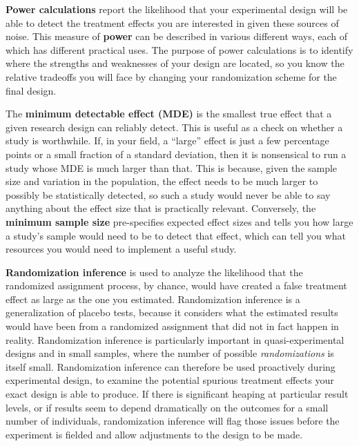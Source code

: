 \textbf{Power calculations} report the likelihood that your experimental design
will be able to detect the treatment effects you are interested in
given these sources of noise.
This measure of \textbf{power} can be described in various different ways,
each of which has different practical uses.
The purpose of power calculations is to identify where the strengths and weaknesses
of your design are located, so you know the relative tradeoffs you will face
by changing your randomization scheme for the final design.

The \textbf{minimum detectable effect (MDE)}
is the smallest true effect that a given research design can reliably detect.
This is useful as a check on whether a study is worthwhile.
If, in your field, a ``large'' effect is just a few percentage points
or a small fraction of a standard deviation,
then it is nonsensical to run a study whose MDE is much larger than that.
This is because, given the sample size and variation in the population,
the effect needs to be much larger to possibly be statistically detected,
so such a study would never be able to say anything about the effect size that is practically relevant.
Conversely, the \textbf{minimum sample size} pre-specifies expected effect sizes
and tells you how large a study's sample would need to be to detect that effect,
which can tell you what resources you would need
to implement a useful study.

\textbf{Randomization inference}
is used to analyze the likelihood
that the randomized assignment process, by chance,
would have created a false treatment effect as large as the one you estimated.
Randomization inference is a generalization of placebo tests,
because it considers what the estimated results would have been
from a randomized assignment that did not in fact happen in reality.
Randomization inference is particularly important
in quasi-experimental designs and in small samples,
where the number of possible \textit{randomizations} is itself small.
Randomization inference can therefore be used proactively during experimental design,
to examine the potential spurious treatment effects your exact design is able to produce.
If there is significant heaping at particular result levels,
or if results seem to depend dramatically on the outcomes for a small number of individuals,
randomization inference will flag those issues before the experiment is fielded
and allow adjustments to the design to be made.

